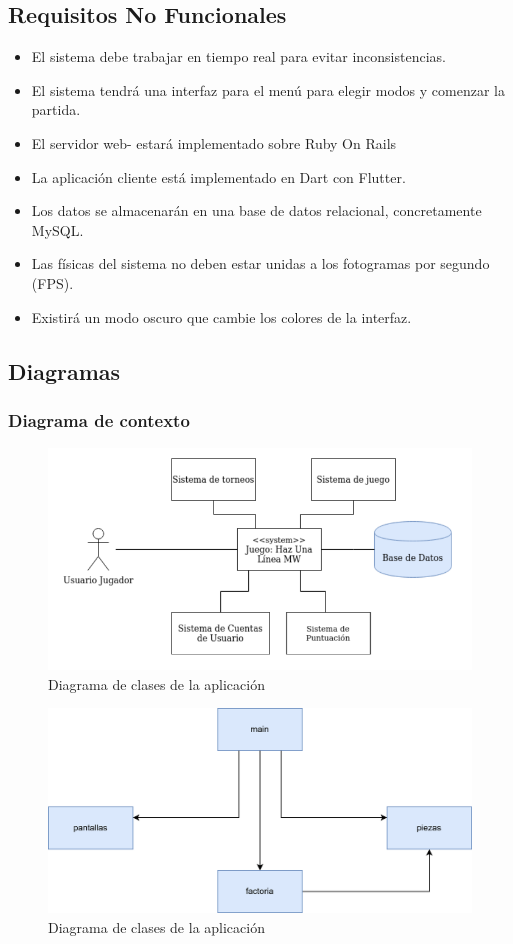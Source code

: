 \documentclass{article}
\begin{document}
\subsection{Requisitos No Funcionales}
\begin{itemize}
    \item El sistema debe trabajar en tiempo real para evitar inconsistencias.
    \item El sistema tendrá una interfaz para el menú para elegir modos y comenzar la partida.
    \item El servidor web- estará implementado sobre Ruby On Rails
    \item La aplicación cliente está implementado en Dart con Flutter.
    \item Los datos se almacenarán en una base de datos relacional, concretamente MySQL.
    \item Las físicas del sistema no deben estar unidas a los fotogramas por segundo (FPS).
    \item Existirá un modo oscuro que cambie los colores de la interfaz.
\end{itemize}

\subsection{Diagramas}
\subsubsection{Diagrama de contexto}
\begin{figure}[H]
  \includegraphics[width=\textwidth]{imagenes/contexto.png}
  \caption{Diagrama de clases de la aplicación} 
\end{figure}
\begin{figure}[H]
  \includegraphics[width=\textwidth]{imagenes/paquetes.png}
  \caption{Diagrama de clases de la aplicación} 
\end{figure}
\end{document}
